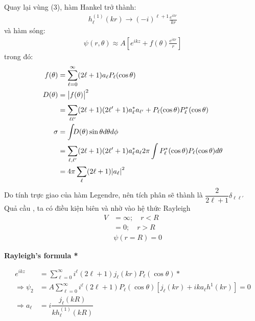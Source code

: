 \documentclass{report}
\renewcommand{\l}{\ell}
\begin{document}
			Quay lại vùng (3), hàm Hankel trở thành:
			\begin{align*}
				h_{\l}^{(1)}(kr) \rightarrow (-i)^{\l+1}\frac{e^{ikr}}{kr}
			\end{align*}
			và hàm sóng:
			\begin{align*}
				\psi(r,\theta) \approx A \left[e^{ikz}+ f(\theta)\frac{e^{ikr}}{r}\right]
			\end{align*}
			trong đó:
			\begin{align*}
				f(\theta) & = \sum_{\l=0}^{\infty}(2\l+1)a_{\l} P_{\l}(\cos\theta)                                                               \\
				D(\theta) & = \abs{f(\theta)}^2                                                                                                  \\
				          & = \sum_{\l\l'}^{}(2\l+1)(2\l'+1) a^{\ast}_{\l} a_{\l'} + P_{\l}(\cos\theta) P^{*}_{\l}(\cos\theta)                   \\
				\sigma    & =    \int_{}D(\theta)\sin\theta d\theta d\phi                                                                        \\
				          & = \sum_{\l,\l'}^{}(2\l+1)(2\l'+1)a^{\ast}_{\l}a_{\l} 2\pi\int P_{\l}^{\ast}(\cos\theta)   P_{\l}(\cos\theta) d\theta \\
				          & = 4\pi \sum_{\l}(2\l+1)\abs{a_\l}^2
			\end{align*}
			Do tính trực giao của hàm Legendre, nên tích phân sẽ thành là $\dfrac{2}{2\l+1}\delta_{\l\l'}$\\
			Quả cầu , ta có điều kiện biên và nhờ vào hệ thức Rayleigh
			\begin{align*}
				V & = \infty; \quad r<R \\
				  & = 0; \quad r>R      \\
				  & \psi(r=R) = 0
			\end{align*}

			\textbf{Rayleigh’s formula *}

			\begin{align}
				e^{ikz}            & = \sum_{\l=0}^{\infty}i^{\l}(2\l+1)j_{\l} (kr) P_{\l}(\cos\theta) *                                                  \\
				\Rightarrow \psi_2 & = A\sum_{\l=0}^{\infty}i^{\l}(2\l+1)P_{\l}(\cos\theta)\left[ j_{\l} (kr)+ika_{\l}h^{1}(kr) \right] = 0 \label{eq1.5} \\
				\Rightarrow a_{\l} & = i\dfrac{j_{\l}(kR)}{k h^{(1)}_{\l}(kR)}\nonumber
			\end{align}
\end{document}

